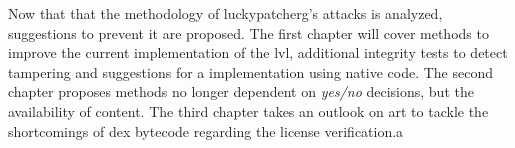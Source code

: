 Now that that the methodology of \gls{luckypatcherg}'s attacks is analyzed, suggestions to prevent it are proposed.
\newline
The first chapter will cover methods to improve the current implementation of the \gls{lvl}, additional integrity tests to detect tampering and suggestions for a implementation using native code.
\newline
The second chapter proposes methods no longer dependent on \textit{yes/no} decisions, but the availability of content.
\newline
The third chapter takes an outlook on \gls{art} to tackle the shortcomings of dex bytecode regarding the license verification.a
